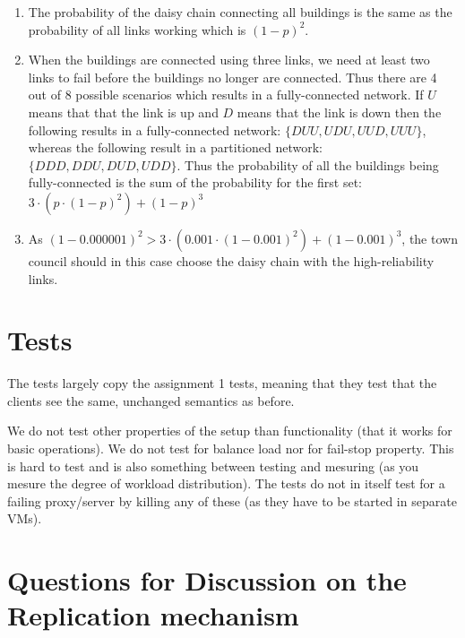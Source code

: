 \documentclass[a4paper, 11pt]{article}
\begin{document}
\begin{enumerate}
    \item The probability of the daisy chain connecting all buildings is the same as the probability of all links working which is $(1-p)^2$.
    \item When the buildings are connected using three links, we need at least two links to fail before the buildings no longer are connected. Thus there are 4 out of 8 possible scenarios which results in a fully-connected network. If $U$ means that that the link is up and $D$ means that the link is down then the following results in a fully-connected network: $\{DUU, UDU, UUD, UUU\}$, whereas the following result in a partitioned network: $\{DDD, DDU, DUD, UDD\}$. Thus the probability of all the buildings being fully-connected is the sum of the probability for the first set: $3 \cdot (p \cdot (1-p)^2) + (1-p)^3$
    \item As $(1-0.000001)^2 > 3 \cdot (0.001 \cdot (1-0.001)^2) + (1-0.001)^3$, the town council should in this case choose the daisy chain with the high-reliability links.
\end{enumerate}

\section{Tests} %
\label{sec:tests}

The tests largely copy the assignment 1 tests, meaning that they test that the clients see the same, unchanged semantics as before.

We do not test other properties of the setup than functionality (that it works for basic operations). We do not test for balance load nor for fail-stop property. This is hard to test and is also something between testing and mesuring (as you mesure the degree of workload distribution).
The tests do not in itself test for a failing proxy/server by killing any of these (as they have to be started in separate VMs).


\section{Questions for Discussion on the Replication mechanism} %
\label{sec:questions_for_discussion_on_the_replication_mechanism}
\end{document}

